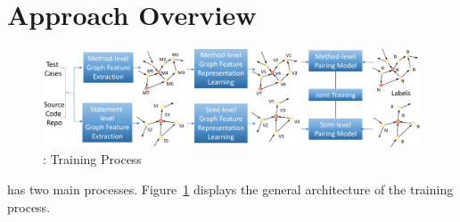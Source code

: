 \section{Approach Overview}
\label{overview:sec}

\begin{figure}[t]
	\centering
	\includegraphics[width=5.4in]{graphs/overview.png}
	\caption{{\tool}: Training Process}
	\label{train-overview}
\end{figure}

{\tool} has two main processes. Figure~\ref{train-overview} displays the
general architecture of the training process.
